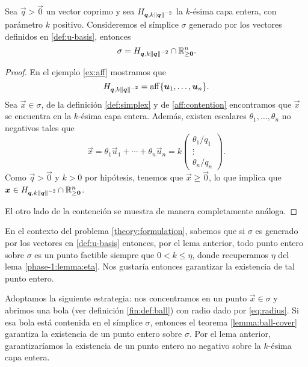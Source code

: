 \begin{lemma}
	\label{lemma:sigmachar1}
	Sea $\vec{q} > \vec{0}$ un vector coprimo y sea $H_{\boldsymbol{q}, k\left\lVert \boldsymbol{q} \right\rVert^{-2}}$ la
	$k$-ésima capa entera, con parámetro $k$ positivo. Consideremos el símplice $\sigma$ generado por
	los vectores definidos en \eqref{def:u-basis}, entonces
	\begin{equation*}
		\sigma = H_{\boldsymbol{q}, k\left\lVert \boldsymbol{q} \right\rVert^{-2}} \cap \mathbb{R}^n_{\geq \boldsymbol{0}}.
	\end{equation*}
\end{lemma}
\begin{proof}
	En el ejemplo \ref{ex:aff} mostramos que
	\begin{equation*}
		\label{eq:aff-layer}
		H_{\boldsymbol{q}, k\left\lVert \boldsymbol{q} \right\rVert^{-2}} = \operatorname{aff}\lbrace \boldsymbol{u}_1, \ldots, \boldsymbol{u}_n \rbrace.
	\end{equation*}
	Sea $\vec{x} \in \sigma$, de la definición \ref{def:simplex} y de \eqref{aff:contention} encontramos
	que $\vec{x}$ se encuentra en la $k$-ésima capa entera. Además, existen escalares $\theta_1,
	\ldots, \theta_n$ no negativos tales que
	\begin{equation*}
		\vec{x} = \theta_1\vec{u}_1 + \cdots + \theta_n\vec{u}_n
		= k\begin{pmatrix}
			\theta_1 / q_1 \\
			\vdots \\
			\theta_n / q_n
		\end{pmatrix}.
	\end{equation*}
	Como $\vec{q} > \vec{0}$ y $k > 0$ por hipótesis, tenemos que $\vec{x} \geq \vec{0}$, lo que
	implica que $\boldsymbol{x} \in H_{\boldsymbol{q}, k\left\lVert \boldsymbol{q} \right\rVert^{-2}} \cap \mathbb{R}^n_{\geq \boldsymbol{0}}$.

	El otro lado de la contención se muestra de manera completamente análoga.
\end{proof}

En el contexto del problema \eqref{theory:formulation}, sabemos que si $\sigma$ es generado por los
vectores en \eqref{def:u-basis} entonces, por el lema anterior, todo punto entero sobre $\sigma$ es
un punto factible siempre que $0 < k \leq \eta$, donde recuperamos $\eta$ del lema
\ref{phase-1:lemma:eta}. Nos gustaría entonces garantizar la existencia de tal punto entero.

Adoptamos la siguiente estrategia: nos concentramos en un punto $\vec{x} \in \sigma$ y abrimos una
bola (ver definición \ref{fin:def:ball}) con radio dado por \eqref{eq:radius}. Si esa bola está
contenida en el símplice $\sigma$, entonces el teorema \ref{lemma:ball-cover} garantiza la
existencia de un punto entero sobre $\sigma$. Por el lema anterior, garantizaríamos la
existencia de un punto entero no negativo sobre la $k$-ésima capa entera.

